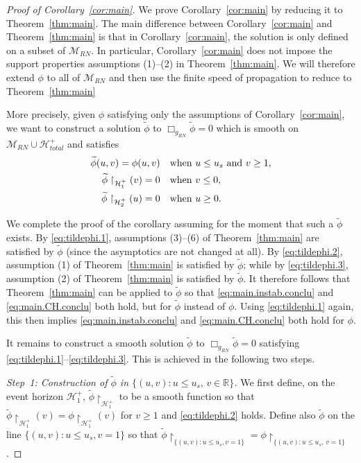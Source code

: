 \documentclass[10pt, reqno]{amsart}
\theoremstyle{definition}
\theoremstyle{remark}
\numberwithin{equation}{section}
\newcommand{\0}{\emptyset}
\newcommand{\calH}{\mathcal H}
\newcommand{\EH}{\calH^{+}}
\newcommand{\pfstep}[1]{\vspace{.5em} {\it #1.}}
\begin{document}
\begin{proof}[Proof of Corollary~\ref{cor:main}]
We prove Corollary~\ref{cor:main} by reducing it to Theorem~\ref{thm:main}. The main difference between Corollary~\ref{cor:main} and Theorem~\ref{thm:main} is that in Corollary~\ref{cor:main}, the solution is only defined on a subset of $\mathcal M_{RN}$. In particular, Corollary~\ref{cor:main} does not impose the support properties assumptions (1)--(2) in Theorem~\ref{thm:main}. We will therefore extend $\phi$ to all of $\mathcal M_{RN}$ and then use the finite speed of propagation to reduce to Theorem~\ref{thm:main}

More precisely, given $\phi$ satisfying only the assumptions of Corollary~\ref{cor:main}, we want to construct a solution $\widetilde{\phi}$ to $\Box_{g_{RN}} \widetilde{\phi} = 0$ which is smooth on $\mathcal M_{RN} \cup \EH_{total}$ and satisfies
\begin{align}
	\widetilde{\phi}(u,v) = \phi(u,v) & \mbox{\quad when $u\leq u_s$ and $v\geq 1$}, \label{eq:tildephi.1}\\
	\widetilde{\phi}\restriction_{\EH_1}(v) = 0 & \mbox{\quad when $v \leq 0$}, \label{eq:tildephi.2}\\
	\widetilde{\phi}\restriction_{\EH_2}(u) = 0 & \mbox{\quad when $u \geq 0$}. \label{eq:tildephi.3}
\end{align}

We complete the proof of the corollary assuming for the moment that such a $\widetilde{\phi}$ exists. By \eqref{eq:tildephi.1}, assumptions (3)--(6) of Theorem~\ref{thm:main} are satisfied by $\widetilde{\phi}$ (since the asymptotics are not changed at all). By \eqref{eq:tildephi.2}, assumption (1) of Theorem~\ref{thm:main} is satisfied by $\widetilde{\phi}$; while by \eqref{eq:tildephi.3}, assumption (2) of Theorem~\ref{thm:main} is satisfied by $\widetilde{\phi}$. It therefore follows that Theorem~\ref{thm:main} can be applied to $\widetilde{\phi}$ so that 
\eqref{eq:main.instab.conclu} and \eqref{eq:main.CH.conclu} both hold, but for $\widetilde{\phi}$ instead of $\phi$. Using \eqref{eq:tildephi.1} again, this then implies \eqref{eq:main.instab.conclu} and \eqref{eq:main.CH.conclu} both hold for $\phi$.

It remains to construct a smooth solution $\widetilde{\phi}$ to $\Box_{g_{RN}}\widetilde{\phi} = 0$ satisfying \eqref{eq:tildephi.1}--\eqref{eq:tildephi.3}. This is achieved in the following two steps.

\pfstep{Step~1: Construction of $\widetilde{\phi}$ in $\{(u,v): u \leq u_s,\, v\in \mathbb R\}$} We first define, on the event horizon $\EH_1$, $\widetilde{\phi}\restriction_{\EH_1}$ to be a smooth function so that $\widetilde{\phi}\restriction_{\EH_1}(v) = {\phi}\restriction_{\EH_1}(v)$ for $v \geq 1$ and \eqref{eq:tildephi.2} holds. Define also $\widetilde{\phi}$ on the line $\{(u,v): u\leq u_s, v = 1\}$ so that $\widetilde{\phi}\restriction_{\{(u,v): u\leq u_s, v = 1\}} = \phi\restriction_{\{(u,v): u\leq u_s,\, v = 1\}}$.


\end{proof}
\end{document}
